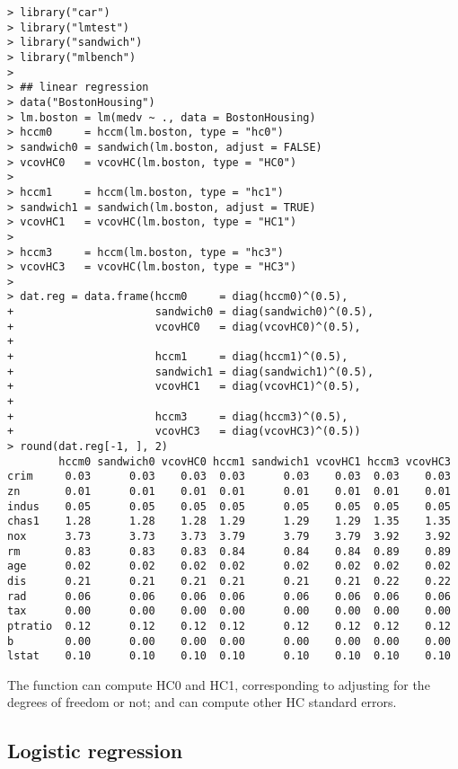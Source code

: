 \begin{lstlisting}
> library("car")
> library("lmtest")
> library("sandwich")
> library("mlbench")
> 
> ## linear regression
> data("BostonHousing")
> lm.boston = lm(medv ~ ., data = BostonHousing)
> hccm0     = hccm(lm.boston, type = "hc0")
> sandwich0 = sandwich(lm.boston, adjust = FALSE)
> vcovHC0   = vcovHC(lm.boston, type = "HC0")
> 
> hccm1     = hccm(lm.boston, type = "hc1") 
> sandwich1 = sandwich(lm.boston, adjust = TRUE) 
> vcovHC1   = vcovHC(lm.boston, type = "HC1")
> 
> hccm3     = hccm(lm.boston, type = "hc3") 
> vcovHC3   = vcovHC(lm.boston, type = "HC3")
> 
> dat.reg = data.frame(hccm0     = diag(hccm0)^(0.5),
+                      sandwich0 = diag(sandwich0)^(0.5),
+                      vcovHC0   = diag(vcovHC0)^(0.5),
+                      
+                      hccm1     = diag(hccm1)^(0.5),
+                      sandwich1 = diag(sandwich1)^(0.5),
+                      vcovHC1   = diag(vcovHC1)^(0.5),
+                      
+                      hccm3     = diag(hccm3)^(0.5),
+                      vcovHC3   = diag(vcovHC3)^(0.5))
> round(dat.reg[-1, ], 2)
        hccm0 sandwich0 vcovHC0 hccm1 sandwich1 vcovHC1 hccm3 vcovHC3
crim     0.03      0.03    0.03  0.03      0.03    0.03  0.03    0.03
zn       0.01      0.01    0.01  0.01      0.01    0.01  0.01    0.01
indus    0.05      0.05    0.05  0.05      0.05    0.05  0.05    0.05
chas1    1.28      1.28    1.28  1.29      1.29    1.29  1.35    1.35
nox      3.73      3.73    3.73  3.79      3.79    3.79  3.92    3.92
rm       0.83      0.83    0.83  0.84      0.84    0.84  0.89    0.89
age      0.02      0.02    0.02  0.02      0.02    0.02  0.02    0.02
dis      0.21      0.21    0.21  0.21      0.21    0.21  0.22    0.22
rad      0.06      0.06    0.06  0.06      0.06    0.06  0.06    0.06
tax      0.00      0.00    0.00  0.00      0.00    0.00  0.00    0.00
ptratio  0.12      0.12    0.12  0.12      0.12    0.12  0.12    0.12
b        0.00      0.00    0.00  0.00      0.00    0.00  0.00    0.00
lstat    0.10      0.10    0.10  0.10      0.10    0.10  0.10    0.10
\end{lstlisting}


The  function can compute HC0 and HC1, corresponding to adjusting for the degrees of freedom or not;  and  can compute other HC standard errors. 


\subsection{Logistic regression}

